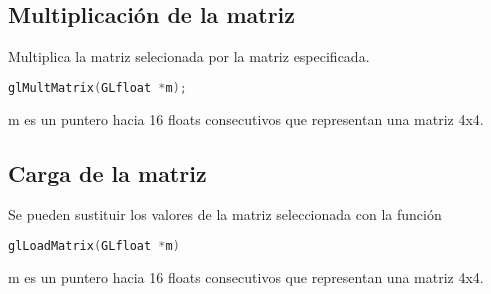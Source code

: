 \subsection{Multiplicación de la matriz}
Multiplica la matriz selecionada por la matriz especificada.
\begin{lstlisting}[language=C]
  glMultMatrix(GLfloat *m);
\end{lstlisting}
m es un puntero hacia 16 floats consecutivos que representan una matriz 4x4.
\subsection{Carga de la matriz}
Se pueden sustituir los valores de la matriz seleccionada con la función
\begin{lstlisting}[language=C]
  glLoadMatrix(GLfloat *m)
\end{lstlisting}
m es un puntero hacia 16 floats consecutivos que representan una matriz 4x4.


